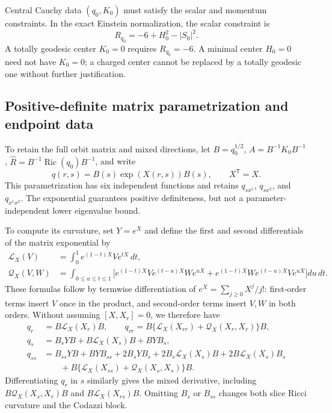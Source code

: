 \documentclass[a4paper,11pt]{article}
\numberwithin{equation}{section}
\theoremstyle{definition}
\newcommand{\Ric}{\operatorname{Ric}}
\begin{document}
Central Cauchy data $(q_0,K_0)$ must satisfy the scalar and momentum constraints. In the exact Einstein normalization, the scalar constraint is
\[
R_{q_0}=-6+H_0^2-|S_0|^2.
\]
A totally geodesic center $K_0=0$ requires $R_{q_0}=-6$. A minimal center $H_0=0$ need not have $K_0=0$; a charged center cannot be replaced by a totally geodesic one without further justification.

\subsection{Positive-definite matrix parametrization and endpoint data}
To retain the full orbit matrix and mixed directions, let $B=q_0^{1/2}$, $A=B^{-1}K_0B^{-1}$, $\widehat R=B^{-1}\Ric(q_0)B^{-1}$, and write
\begin{equation}\label{eq:matrix-exponential-metric}
 q(r,s)=B(s)\exp(X(r,s))B(s),\qquad X^{\mathsf T}=X.
\end{equation}
This parametrization has six independent functions and retains $q_{sx^1}$, $q_{sx^2}$, and $q_{x^1x^2}$.
The exponential guarantees positive definiteness, but not a parameter-independent lower eigenvalue bound.

To compute its curvature, set $Y=e^X$ and define the first and second differentials of the matrix exponential by
\begin{align}
 \mathcal L_X(V)&=\int_0^1e^{(1-t)X}Ve^{tX}\,dt,\label{eq:exp-first}\\
 \mathcal Q_X(V,W)&=\int_{0\le u\le t\le1}
 \bigl[e^{(1-t)X}Ve^{(t-u)X}We^{uX}
       +e^{(1-t)X}We^{(t-u)X}Ve^{uX}\bigr]du\,dt.
 \label{eq:exp-second}
\end{align}
These formulas follow by termwise differentiation of $e^X=\sum_{j\ge0}X^j/j!$:
first-order terms insert $V$ once in the product, and second-order terms insert $V,W$ in both orders.
Without assuming $[X,X_r]=0$, we therefore have
\begin{align}
 q_r&=B\mathcal L_X(X_r)B,\qquad
 q_{rr}=B\{\mathcal L_X(X_{rr})+\mathcal Q_X(X_r,X_r)\}B,
 \label{eq:exp-radial}\\
 q_s&=B_sYB+B\mathcal L_X(X_s)B+BYB_s,\nonumber\\
 q_{ss}&=B_{ss}YB+BYB_{ss}+2B_sYB_s
       +2B_s\mathcal L_X(X_s)B+2B\mathcal L_X(X_s)B_s\nonumber\\
 &\hspace{2em}+B\{\mathcal L_X(X_{ss})+\mathcal Q_X(X_s,X_s)\}B.
 \label{eq:exp-spatial}
\end{align}
Differentiating $q_r$ in $s$ similarly gives the mixed derivative, including
$B\mathcal Q_X(X_s,X_r)B$ and $B\mathcal L_X(X_{rs})B$.
Omitting $B_s$ or $B_{ss}$ changes both slice Ricci curvature and the Codazzi block.
\end{document}
